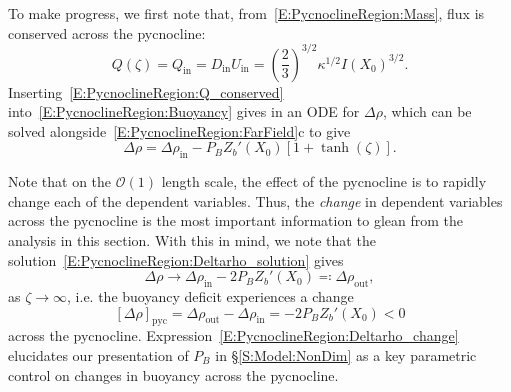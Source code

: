 \documentclass[openacc]{rsproca_new}%
\newcommand{\order}[1]{\mathcal{O}(#1)}
\newcommand{\Pb}{\textit{P}_B}  %
\renewcommand{\in}{\text{in}} %
\newcommand{\out}{\text{out}}
\begin{document}
To make progress, we first note that, from~\eqref{E:PycnoclineRegion:Mass}, flux is conserved across the pycnocline:
\begin{equation}\label{E:PycnoclineRegion:Q_conserved}
Q(\zeta) = Q_{\in} = D_{\in} U_{\in}  =\left(\frac{2}{3}\right)^{3/2} \kappa^{1/2}I(X_0)^{3/2}.
\end{equation}
Inserting~\eqref{E:PycnoclineRegion:Q_conserved} into~\eqref{E:PycnoclineRegion:Buoyancy} gives in an ODE for $\Delta \rho$, which can be solved alongside~\eqref{E:PycnoclineRegion:FarField}c to give
\begin{equation}\label{E:PycnoclineRegion:Deltarho_solution}
\Delta \rho = \Delta \rho_{\in} - \Pb Z_b'(X_0) \left[1 + \tanh(\zeta)\right].
\end{equation} 

Note that on the $\order{1}$ length scale, the effect of the pycnocline is to rapidly change each of the dependent variables. Thus, the \textit{change} in dependent variables across the pycnocline is the most important information to glean from the analysis in this section. With this in mind, we note that the solution~\eqref{E:PycnoclineRegion:Deltarho_solution} gives
\begin{equation}\label{E:PycnoclineRegion:Deltarho_limit}
\Delta \rho \to \Delta \rho_{\in} - 2 \Pb Z_b'(X_0)  \eqcolon \Delta \rho_\out,
\end{equation}
as $\zeta \to \infty$, i.e. the buoyancy deficit experiences a change
\begin{equation}\label{E:PycnoclineRegion:Deltarho_change}
\left[\Delta \rho\right]_{\text{pyc}} = \Delta \rho_\out - \Delta \rho_\in = - 2 \Pb Z_b'(X_0) < 0
\end{equation}
across the pycnocline. Expression~\eqref{E:PycnoclineRegion:Deltarho_change} elucidates our presentation of $\Pb$ in \S\ref{S:Model:NonDim} as a key parametric control on changes in buoyancy across the pycnocline.
\end{document}
